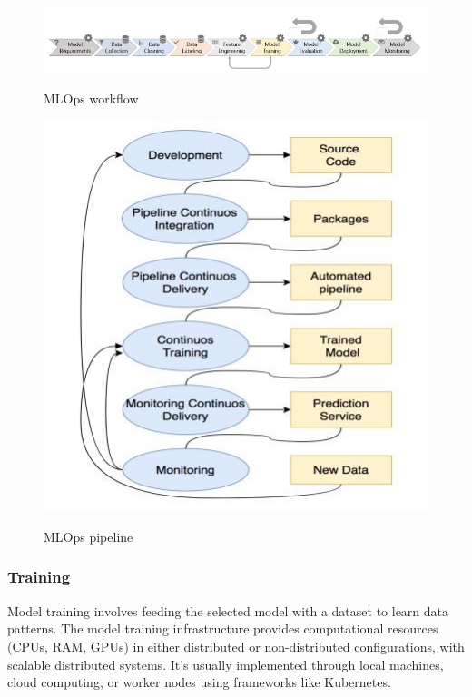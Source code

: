 \begin{figure}[!htbp]
    \caption{MLOps workflow\cite{8804457}}
    \centering
    \includegraphics[scale=0.6]{images/mlops-workflow-9-stages}
    \label{fig:mlops-workflow}
\end{figure}

\begin{figure}[!htbp]
    \caption{MLOps pipeline\cite{inproceedings}}
    \centering
    \includegraphics[scale=0.5]{images/mlops-pipeline}
    \label{fig:mlops-pipeline}
\end{figure}

\subsubsection{Training}

Model training involves feeding the selected model with a dataset to learn data patterns.
The model training infrastructure provides computational resources (CPUs, RAM, GPUs) in either distributed or non-distributed configurations, with scalable distributed systems.
It's usually implemented through local machines, cloud computing, or worker nodes using frameworks like Kubernetes\cite{Kreuzberger2022MachineLO, Haakman2021}.


